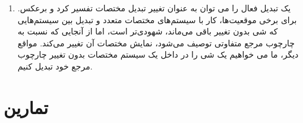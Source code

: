 {\begin{spacing}{1.5}
\begin{enumerate}[label=\textbf{\arabic*}.]
            \item {یک تبدیل فعال را می توان به عنوان تغییر تبدیل مختصات تفسیر کرد و برعکس.
            برای برخی موقعیت‌ها، کار با سیستم‌های مختصات متعدد و تبدیل بین سیستم‌هایی که شی بدون تغییر باقی می‌ماند، شهودی‌تر است،
            اما از آنجایی که نسبت به چارچوب مرجع متفاوتی توصیف می‌شود، نمایش مختصات آن تغییر می‌کند.
            مواقع دیگر، ما می خواهیم یک شی را در داخل یک سیستم مختصات بدون تغییر چارچوب مرجع خود تبدیل کنیم.}
        \end{enumerate}
    \end{spacing}
}
\newpage


\section{\textbf{تمارین}}
\label{sec:3.7}
